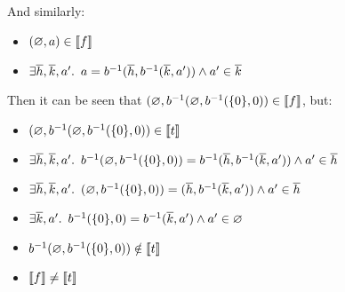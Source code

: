And similarly:

\begin{itemize}
  \item[\phantom{\imps}]
    $(\varnothing,a)\in\llbracket f \rrbracket$

  \item[\iffs]
    $\exists\overline{h},\overline{k},a^\prime\ldotp~a = b^{-1}(\overline{h}, b^{-1}(\overline{k},a^\prime))\land a^\prime\in\overline{k}$

\end{itemize}

Then it can be seen that $(\varnothing,b^{-1}(\varnothing,b^{-1}(\{0\},0))\in\llbracket f \rrbracket$, but:
\begin{itemize}
  \item[\phantom{\imps}]
    $(\varnothing,b^{-1}(\varnothing,b^{-1}(\{0\},0))\in\llbracket t \rrbracket$

  \item[\iffs]
    $\exists\overline{h},\overline{k},a^\prime\ldotp~b^{-1}(\varnothing,b^{-1}(\{0\},0)) = b^{-1}(\overline{h}, b^{-1}(\overline{k},a^\prime))\land a^\prime\in\overline{h}$

  \item[\iffs]
    $\exists\overline{h},\overline{k},a^\prime\ldotp~(\varnothing,b^{-1}(\{0\},0)) = (\overline{h}, b^{-1}(\overline{k},a^\prime))\land a^\prime\in\overline{h}$

  \item[\iffs]
    $\exists\overline{k},a^\prime\ldotp~b^{-1}(\{0\},0) = b^{-1}(\overline{k},a^\prime)\land a^\prime\in\varnothing$

  \item[\imps]
    $b^{-1}(\varnothing,b^{-1}(\{0\},0))\notin\llbracket t \rrbracket$

  \item[\imps]
    $\llbracket f \rrbracket\neq\llbracket t \rrbracket$
\end{itemize}

